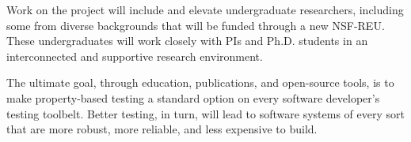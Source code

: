Work on the project will include and elevate undergraduate
researchers, including some from diverse backgrounds that will be
funded through a new NSF-REU. These undergraduates will work
closely with PIs and Ph.D.{} students in an interconnected and supportive
research environment.

The ultimate goal, through education, publications, and open-source
tools, is to make property-based testing a standard option on every
software developer's testing toolbelt.  Better testing, in turn, will
lead to software systems of every sort that are more robust, more
reliable, and less expensive to build.


